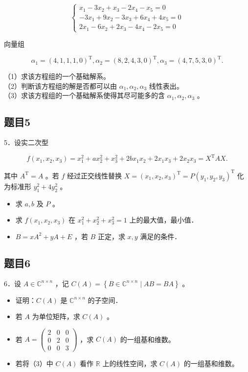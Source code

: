 \documentclass{article}
\begin{document}
\[
\left\{\begin{array}{l}
x_{1}-3 x_{2}+x_{3}-2 x_{4}-x_{5}=0 \\
-3 x_{1}+9 x_{2}-3 x_{3}+6 x_{4}+4 x_{5}=0 \\
2 x_{1}-6 x_{2}+2 x_{3}-4 x_{4}-2 x_{5}=0
\end{array}\right.
\]

向量组

\[
\alpha_{1}=(4,1,1,1,0)^{\mathrm{T}}, \alpha_{2}=(8,2,4,3,0)^{\mathrm{T}}, \alpha_{3}=(4,7,5,3,0)^{\mathrm{T}} .
\]

（1）求该方程组的一个基础解系。\\
（2）判断该方程组的解是否都可以由 \(\alpha_{1}, \alpha_{2}, \alpha_{3}\) 线性表出。\\
（3）求该方程组的一个基础解系使得其尽可能多的含 \(\alpha_{1}, \alpha_{2}, \alpha_{3}\) 。

\subsection{题目5}
5．设实二次型

\[
f\left(x_{1}, x_{2}, x_{3}\right)=x_{1}^{2}+a x_{2}^{2}+x_{3}^{2}+2 b x_{1} x_{2}+2 x_{1} x_{3}+2 x_{2} x_{3}=X^{\mathrm{T}} A X .
\]

其中 \(A^{\mathrm{T}}=A\) 。若 \(f\) 经过正交线性替换 \(X=\left(x_{1}, x_{2}, x_{3}\right)^{\mathrm{T}}=P\left(y_{1}, y_{2}, y_{3}\right)^{\mathrm{T}}\) 化为标准形 \(y_{1}^{2}+4 y_{2}^{2}\) 。

\begin{itemize}
  \item[（1）] 求 \(a, b\) 及 \(P\) 。
  \item[（2）] 求 \(f\left(x_{1}, x_{2}, x_{3}\right)\) 在 \(x_{1}^{2}+x_{2}^{2}+x_{3}^{2}=1\) 上的最大值，最小值．
  \item[（3）] \(B=x A^{2}+y A+E\) ，若 \(B\) 正定，求 \(x, y\) 满足的条件．
\end{itemize}

\subsection{题目6}
6．设 \(A \in \mathbb{C}^{n \times n}\) ，记 \(C(A)=\left\{B \in \mathbb{C}^{n \times n} \mid A B=B A\right\}\) 。

\begin{itemize}
  \item[（1）] 证明：\(C(A)\) 是 \(\mathbb{C}^{n \times n}\) 的子空间．
  \item[（2）] 若 \(A\) 为单位矩阵，求 \(C(A)\) 。
  \item[（3）] 若 \(A=\left(\begin{array}{lll}2 & 0 & 0 \\ 0 & 2 & 0 \\ 0 & 0 & 3\end{array}\right)\) ，求 \(C(A)\) 的一组基和维数。
  \item[（4）] 若将（3）中 \(C(A)\) 看作 \(\mathbb{R}\) 上的线性空间，求 \(C(A)\) 的一组基和维数。
\end{itemize}
\end{document}
